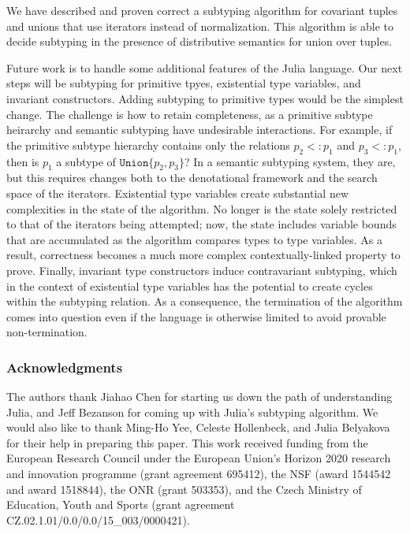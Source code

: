 \documentclass[a4paper,english]{lipics-v2019}
\newcommand{\xt}[1]{\texttt{#1}}
\newcommand{\union}[2]{\xt{Union\{}#1,#2\xt{\}}}
\newcommand{\sub}{<:}
\begin{document}
We have described and proven correct a subtyping algorithm for covariant
tuples and unions that use iterators instead of normalization.  This
algorithm is able to decide subtyping in the presence of distributive
semantics for union over tuples.

Future work is to handle some additional features of the Julia language.
Our next steps will be subtyping for primitive tpyes, existential type
variables, and invariant constructors.  Adding subtyping to primitive
types would be the simplest change. The challenge is how to retain
completeness, as a primitive subtype heirarchy and semantic subtyping have
undesirable interactions.  For example, if the primitive subtype hierarchy
contains only the relations $p_2 \sub p_1$ and $p_3 \sub p_1$, then is
$p_1$ a subtype of $\union{p_2}{p_3}$? In a semantic subtyping system, they
are, but this requires changes both to the denotational framework and the
search space of the iterators.  Existential type variables create
substantial new complexities in the state of the algorithm. No longer is the
state solely restricted to that of the iterators being attempted; now, the
state includes variable bounds that are accumulated as the algorithm
compares types to type variables. As a result, correctness becomes a much
more complex contextually-linked property to prove.  Finally, invariant type
constructors induce contravariant subtyping, which in the context of
existential type variables has the potential to create cycles within the
subtyping relation. As a consequence, the termination of the algorithm comes
into question even if the language is otherwise limited to avoid provable
non-termination.

\medskip

\subsubsection*{Acknowledgments} The authors thank Jiahao Chen for starting us
down the path of understanding Julia, and Jeff Bezanson for coming up with
Julia's subtyping algorithm. We would  also like to thank Ming-Ho Yee, Celeste
Hollenbeck, and Julia Belyakova for their help in preparing this paper. This
work received funding from the European Research Council under the European
Union's Horizon 2020 research and innovation programme (grant agreement
695412), the NSF (award 1544542 and award 1518844), the ONR (grant 503353),
and the Czech Ministry of Education, Youth and Sports (grant agreement
CZ.02.1.01/0.0/0.0/15\_003/0000421).
 

%

\end{document}
